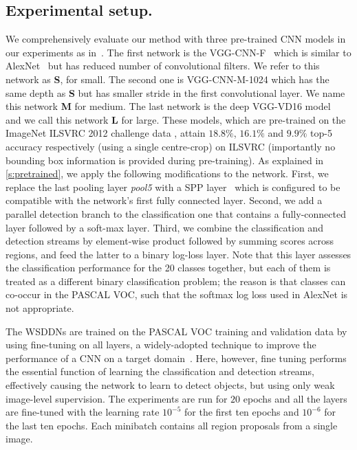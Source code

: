 \subsection{Experimental setup.}\label{subsec:expsetup}
We comprehensively evaluate our method with three pre-trained CNN models in our experiments as in~\cite{Girshick15}. The first network is the VGG-CNN-F~\cite{Chatfield14} which is similar to AlexNet~\cite{Krizhevsky12} but has reduced number of convolutional filters. We refer to this network as \textbf{S}, for small. The second one is VGG-CNN-M-1024 which has the same depth as \textbf{S} but has smaller stride in the first convolutional layer. We name this network \textbf{M} for medium. The last network is the deep VGG-VD16 model~\cite{Simonyan15} and we call this network \textbf{L} for large. These models, which are pre-trained on the ImageNet ILSVRC 2012 challenge data \cite{Russakovsky15}, attain  $18.8 \%$, $16.1 \%$ and $9.9 \%$ top-5 accuracy respectively (using a single centre-crop) on ILSVRC (importantly no bounding box information is provided during pre-training). As explained in \cref{s:pretrained}, we apply the following modifications to the network. First, we replace the last pooling layer \textit{pool5} with a SPP layer~\cite{He14} which is configured to be compatible with the network's first fully connected layer. Second, we add a parallel detection branch to the classification one that contains a fully-connected layer followed by a soft-max layer. Third, we combine the classification and detection streams by element-wise product followed by summing scores across regions, and feed the latter to a binary log-loss layer. Note that this layer assesses the classification performance for the 20 classes together, but each of them is treated as a different binary classification problem; the reason is that classes can co-occur in the PASCAL VOC, such that the softmax log loss used in AlexNet is not appropriate.

The WSDDNs are trained on the PASCAL VOC training and validation data by using fine-tuning on all layers, a widely-adopted technique to improve the performance of a CNN on a target domain~\cite{Chatfield14}. Here, however, fine tuning performs the essential function of learning the classification and detection streams, effectively causing the network to learn to detect objects, but using only weak image-level supervision. The experiments are run for $20$ epochs and all the layers are fine-tuned with the learning rate $10^{-5}$ for the first ten epochs and $10^{-6}$ for the last ten epochs. Each minibatch contains all region proposals from a single image.

